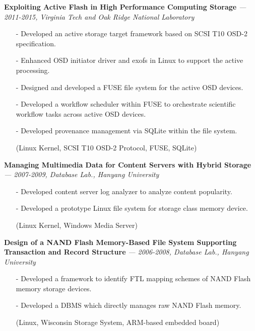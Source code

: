   \vspace{-0.15in}
  {\bf Exploiting Active Flash in High Performance Computing Storage}
    {\it \footnotesize --- 2011-2015, Virginia Tech and Oak Ridge National Laboratory}
    \begin{itemize}[leftmargin=*]
    \setlength\itemsep{-0.02in}
    \item[-] Developed an active storage target framework based on SCSI T10 OSD-2
    specification.
    \item[-] Enhanced OSD initiator driver and exofs in Linux to support the active
    processing.
    \item[-] Designed and developed a FUSE file system for the active OSD devices.
    \item[-] Developed a workflow scheduler within FUSE to orchestrate scientific
    workflow tasks across active OSD devices.
    \item[-] Developed provenance management via SQLite within the file system.
    \item[] {\small(Linux Kernel, SCSI T10 OSD-2 Protocol, FUSE, SQLite)}
    \end{itemize}
  \vspace{-0.15in}
  {\bf Managing Multimedia Data for Content Servers with Hybrid Storage}
    {\it \footnotesize --- 2007-2009, Database Lab., Hanyang University}
    \begin{itemize}[leftmargin=*]
    \setlength\itemsep{-0.02in}
    \item[-] Developed content server log analyzer to analyze content popularity.
    \item[-] Developed a prototype Linux file system for storage class memory device.
    \item[] {\small(Linux Kernel, Windows Media Server)}
    \end{itemize}
  \vspace{-0.15in}
  {\bf Design of a NAND Flash Memory-Based File System Supporting Transaction and
      Record Structure} 
    {\it \footnotesize --- 2006-2008, Database Lab., Hanyang University}
    \begin{itemize}[leftmargin=*]
    \setlength\itemsep{-0.02in}
    \item[-] Developed a framework to identify FTL mapping schemes of NAND Flash memory
    storage devices.
    \item[-] Developed a DBMS which directly manages raw NAND Flash memory.
    \item[] {\small(Linux, Wisconsin Storage System, ARM-based embedded
     board)}
    \end{itemize}

